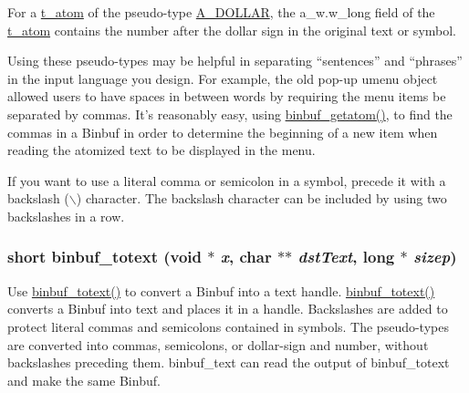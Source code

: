 For a \hyperlink{structt__atom}{t\_\-atom} of the pseudo-\/type \hyperlink{group__atom_gga8aa6700e9f00b132eb376db6e39ade47af0a5a9017f6b59e82a4859cd0560d36b}{A\_\-DOLLAR}, the a\_\-w.w\_\-long field of the \hyperlink{structt__atom}{t\_\-atom} contains the number after the dollar sign in the original text or symbol.

Using these pseudo-\/types may be helpful in separating “sentences” and “phrases” in the input language you design. For example, the old pop-\/up umenu object allowed users to have spaces in between words by requiring the menu items be separated by commas. It’s reasonably easy, using \hyperlink{group__binbuf_ga0eccee2d50ae561c625cc97238f1e21a}{binbuf\_\-getatom()}, to find the commas in a Binbuf in order to determine the beginning of a new item when reading the atomized text to be displayed in the menu.

If you want to use a literal comma or semicolon in a symbol, precede it with a backslash ($\backslash$) character. The backslash character can be included by using two backslashes in a row. \hypertarget{group__binbuf_ga739086c676dfaba01dff1f70e7487dd5}{
\subsubsection[{binbuf\_\-totext}]{\setlength{\rightskip}{0pt plus 5cm}short binbuf\_\-totext (void $\ast$ {\em x}, \/  char $\ast$$\ast$ {\em dstText}, \/  long $\ast$ {\em sizep})}}
\label{group__binbuf_ga739086c676dfaba01dff1f70e7487dd5}


Use \hyperlink{group__binbuf_ga739086c676dfaba01dff1f70e7487dd5}{binbuf\_\-totext()} to convert a Binbuf into a text handle. \hyperlink{group__binbuf_ga739086c676dfaba01dff1f70e7487dd5}{binbuf\_\-totext()} converts a Binbuf into text and places it in a handle. Backslashes are added to protect literal commas and semicolons contained in symbols. The pseudo-\/types are converted into commas, semicolons, or dollar-\/sign and number, without backslashes preceding them. binbuf\_\-text can read the output of binbuf\_\-totext and make the same Binbuf.


